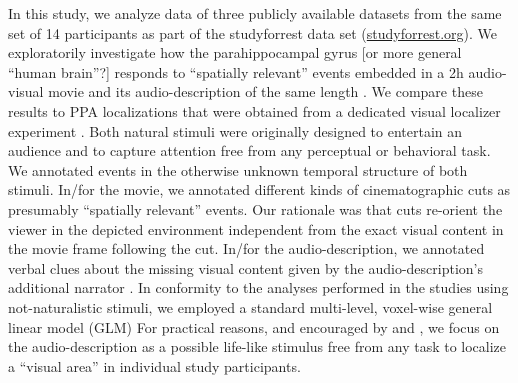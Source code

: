 \documentclass[english]{article}
\begin{document}

In this study, we analyze data of three publicly available datasets from the same set of 14 participants as part of the studyforrest data set (\href{http://www.studyforrest.org}{studyforrest.org}).
We exploratorily investigate how the parahippocampal gyrus [or more general ``human brain''?] responds to ``spatially relevant'' events embedded in a 2h audio-visual movie \citep{hanke2016simultaneous} and its audio-description of the same length \citep{hanke2014audiomovie}.
We compare these results to PPA localizations that were obtained from a dedicated visual localizer experiment \citep{sengupta2016extension}.
Both natural stimuli were originally designed to entertain an audience and to capture attention free from any perceptual or behavioral task.
We annotated events in the otherwise unknown temporal structure of both stimuli.
In/for the movie, we annotated different kinds of cinematographic cuts \citep{haeusler2016cutanno} as presumably ``spatially relevant'' events.
Our rationale was that cuts re-orient the viewer in the depicted environment independent from the exact visual content in the movie frame following the cut.
In/for the audio-description, we annotated verbal clues about the missing visual content given by the audio-description's additional narrator \citep{haeusler2020speechanno}.
In conformity to the analyses performed in the studies using not-naturalistic stimuli, we employed a standard multi-level, voxel-wise general linear model (GLM) %
For practical reasons, and encouraged by \citep{aziz2008modulation} and \citep{aminoff2013role}, we focus on the audio-description as a possible life-like stimulus free from any task to localize a ``visual area'' in individual study participants.
\end{document}
